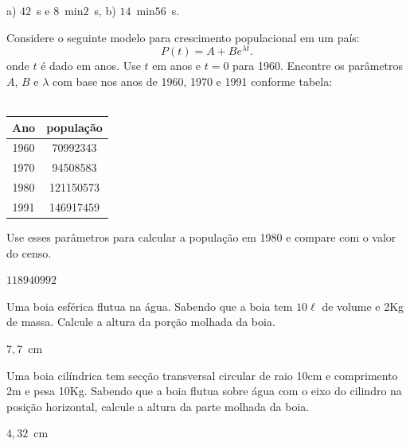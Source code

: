 \begin{Answer}
  \begin{tiny}
a) $42$~s e $8$~min$2$~s, b) $14$~min$56$~s.    
  \end{tiny}
\end{Answer}


\begin{Exercise}\label{pop} Considere o seguinte modelo para crescimento populacional em um país:
$$P(t)=A+Be^{\lambda t}.$$
onde $t$ é dado em anos. Use $t$ em anos e $t=0$ para 1960. Encontre os parâmetros $A$, $B$ e $\lambda$ com base nos anos de 1960, 1970 e 1991 conforme tabela:\\~

\begin{tabular}{|c|c|}
\hline
Ano & população\\
\hline
1960&70992343\\
1970&94508583\\
1980&121150573\\
1991&146917459\\
\hline	
\end{tabular}

Use esses parâmetros para calcular a população em 1980 e compare com o valor do censo.
\end{Exercise}
\begin{Answer}
  \begin{tiny}
$118940992$
  \end{tiny}
\end{Answer}

\begin{Exercise}[title=Fluidos]\label{boiaesf} Uma boia esférica flutua na água. Sabendo que a boia tem $10\ell$ de volume e 2Kg de massa. Calcule a altura da porção molhada da boia.
\end{Exercise}
\begin{Answer}
  \begin{tiny}
$7,7$~cm    
  \end{tiny}
\end{Answer}

\begin{Exercise}[title= Fluidos]\label{boiacil} Uma boia cilíndrica tem secção transversal circular de raio 10cm e comprimento 2m e pesa 10Kg. Sabendo que a boia flutua sobre água com o eixo do cilindro na posição horizontal, calcule a altura da parte molhada da boia.
\end{Exercise}
\begin{Answer}
  \begin{tiny}
$4,32$~cm    
  \end{tiny}
\end{Answer}

